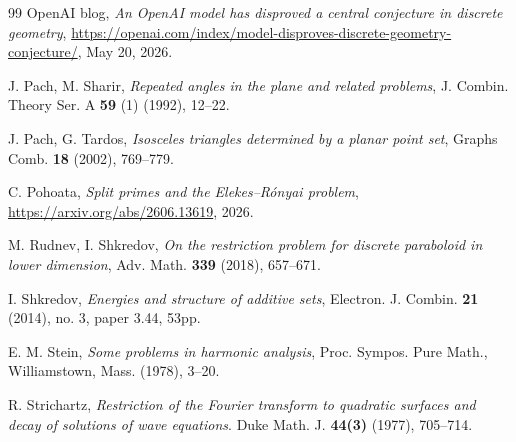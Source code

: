 \documentclass[11pt,reqno]{amsart}
\numberwithin{equation}{section}
\begin{document}
\begin{thebibliography}{99}
 OpenAI blog, \textit{An OpenAI model has disproved a central conjecture in discrete geometry}, \url{https://openai.com/index/model-disproves-discrete-geometry-conjecture/}, May 20, 2026.

 J. Pach, M. Sharir, \textit{Repeated angles in the plane and related problems}, J. Combin. Theory Ser. A \textbf{59} (1) (1992), 12--22.

 J. Pach, G. Tardos, \textit{Isosceles triangles determined by a planar point set}, Graphs Comb. \textbf{18} (2002), 769--779.


 C. Pohoata, \textit{Split primes and the Elekes--R\'{o}nyai problem}, \url{https://arxiv.org/abs/2606.13619}, 2026.

 M. Rudnev, I. Shkredov, \textit{On the restriction problem for discrete paraboloid in lower dimension}, Adv. Math. \textbf{339} (2018), 657--671.



 I. Shkredov, \textit{Energies and structure of additive sets}, Electron. J. Combin. \textbf{21} (2014), no. 3, paper 3.44, 53pp.


 E. M. Stein, \textit{Some problems in harmonic analysis}, Proc. Sympos. Pure Math., Williamstown, Mass. (1978), 3--20.


 R. Strichartz, \textit{Restriction of the Fourier transform to quadratic surfaces and decay of solutions of wave equations}. Duke Math. J. \textbf{44(3)} (1977), 705--714.


\end{thebibliography}
\end{document}
